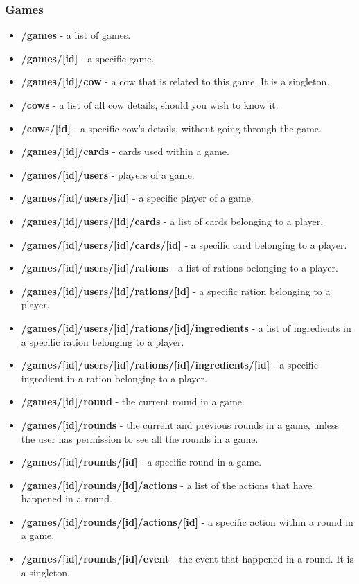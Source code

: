 \subsubsection{Games}
\begin{itemize}
	\item \textbf{/games} - a list of games.
	\item \textbf{/games/[id]} - a specific game.
	\item \textbf{/games/[id]/cow} - a cow that is related to this game. It is a singleton.
	\item \textbf{/cows} - a list of all cow details, should you wish to know it.
	\item \textbf{/cows/[id]} - a specific cow's details, without going through the game.
	\item \textbf{/games/[id]/cards} - cards used within a game.
	\item \textbf{/games/[id]/users} - players of a game.
	\item \textbf{/games/[id]/users/[id]} - a specific player of a game.
	\item \textbf{/games/[id]/users/[id]/cards} - a list of cards belonging to a player.
	\item \textbf{/games/[id]/users/[id]/cards/[id]} - a specific card belonging to a player.
	\item \textbf{/games/[id]/users/[id]/rations} - a list of rations belonging to a player.
	\item \textbf{/games/[id]/users/[id]/rations/[id]} - a specific ration belonging to a player.
	\item \textbf{/games/[id]/users/[id]/rations/[id]/ingredients} - a list of ingredients in a specific ration belonging to a player.
	\item \textbf{/games/[id]/users/[id]/rations/[id]/ingredients/[id]} - a specific ingredient in a ration belonging to a player.
	\item \textbf{/games/[id]/round} - the current round in a game.
	\item \textbf{/games/[id]/rounds} - the current and previous rounds in a game, unless the user has permission to see all the rounds in a game.
	\item \textbf{/games/[id]/rounds/[id]} - a specific round in a game.
	\item \textbf{/games/[id]/rounds/[id]/actions} - a list of the actions that have happened in a round.
	\item \textbf{/games/[id]/rounds/[id]/actions/[id]} - a specific action within a round in a game.
	\item \textbf{/games/[id]/rounds/[id]/event} - the event that happened in a round. It is a singleton.
\end{itemize}


